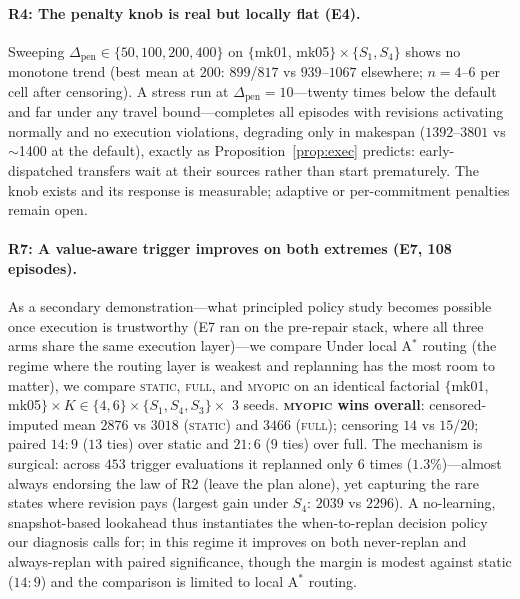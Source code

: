 \documentclass[twocolumn]{article}
\begin{document}
\paragraph{R4: The penalty knob is real but locally flat (E4).}
Sweeping $\Delta_{\mathrm{pen}}\in\{50,100,200,400\}$ on
$\{$mk01, mk05$\}{\times}\{S_1,S_4\}$ shows no monotone trend
(best mean at $200$: $899$/$817$ vs $939$--$1067$ elsewhere;
$n{=}4$--$6$ per cell after censoring). A stress run at
$\Delta_{\mathrm{pen}}{=}10$---twenty times below the default and far
under any travel bound---completes all episodes with revisions
activating normally and no execution violations, degrading only in
makespan ($1392$--$3801$ vs $\sim$1400 at the default), exactly as
Proposition~\ref{prop:exec} predicts: early-dispatched transfers wait
at their sources rather than start prematurely. The knob exists and its
response is measurable; adaptive or per-commitment penalties remain
open.

\paragraph{R7: A value-aware trigger improves on both extremes (E7,
108 episodes).} As a secondary demonstration---what principled policy
study becomes possible once execution is trustworthy (E7 ran on the
pre-repair stack, where all three arms share the same execution
layer)---we compare
Under local A$^*$ routing (the regime where the routing layer is
weakest and replanning has the most room to matter), we compare
\textsc{static}, \textsc{full}, and \textsc{myopic} on an identical
factorial $\{$mk01, mk05$\}\times K\in\{4,6\}\times\{S_1,S_4,S_3\}
\times$ 3 seeds. \textbf{\textsc{myopic} wins overall}: censored-imputed
mean $2876$ vs $3018$ (\textsc{static}) and $3466$ (\textsc{full});
censoring $14$ vs $15$/$20$; paired $14{:}9$ ($13$ ties) over static and
$21{:}6$ ($9$ ties) over full. The mechanism is surgical: across $453$
trigger evaluations it replanned only $6$ times ($1.3\%$)---almost
always endorsing the law of R2 (leave the plan alone), yet capturing the
rare states where revision pays (largest gain under $S_4$: $2039$ vs
$2296$). A no-learning, snapshot-based lookahead thus instantiates the
when-to-replan decision policy our diagnosis calls for; in this regime
it improves on both never-replan and always-replan with paired
significance, though the margin is modest against static ($14{:}9$) and
the comparison is limited to local A$^*$ routing.
\end{document}

